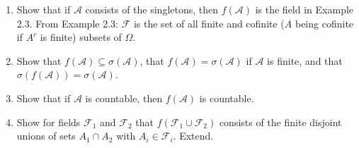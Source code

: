 \documentclass[12pt]{article}
\newcommand{\F}{\mathcal{F}}
\newcommand{\A}{\mathcal{A}}
\newcommand{\seq}{\subseteq}
\newcommand{\Om}{\Omega}
\newcommand{\un}{\cup}
\newcommand{\ic}{\cap}
\newenvironment{exercise}[2][Exercise]{\begin{trivlist}
\item[\hskip \labelsep {\bfseries #1}\hskip \labelsep {\bfseries #2.}]}{\end{trivlist}}
\begin{document}
\begin{exercise}{2.6}
    \begin{enumerate}
        \item Show that if $\A$ consists of the singletons, then $f(\A)$ is the field in Example 2.3. From Example 2.3: $\F$ is the set of all finite and cofinite ($A$ being cofinite if $A^c$ is finite) subsets of $\Om$.
        \item Show that $f(\A) \seq \sigma (\A)$, that $f(\A) = \sigma (\A)$ if $\A$ is finite, and that $\sigma (f(\A)) = \sigma (\A)$.
        \item Show that if $\A$ is countable, then $f(\A)$ is countable.
        \item Show for fields $\F_1$ and $\F_2$ that $f(\F_1 \un \F_2)$ consists of the finite disjoint unions of sets $A_1 \ic A_2$ with $A_i \in \F_i$. Extend.
    \end{enumerate}
\end{exercise}
\end{document}
